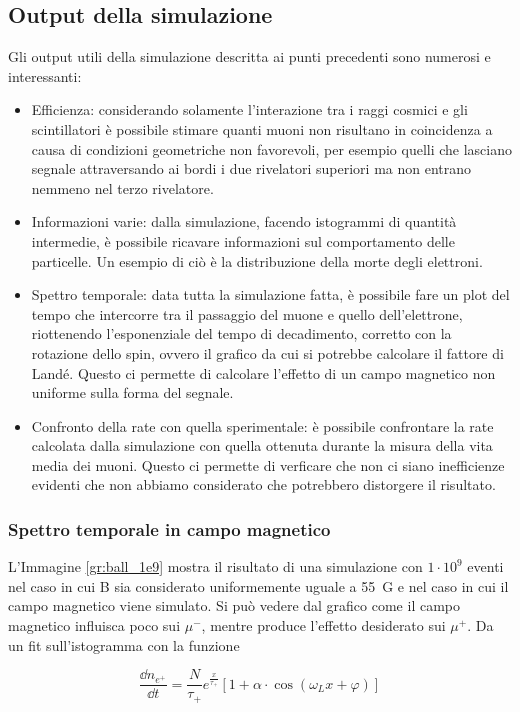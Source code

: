 \subsection{Output della simulazione}
Gli output utili della simulazione descritta ai punti precedenti sono numerosi e interessanti:
\begin{itemize}
\item Efficienza: considerando solamente l'interazione tra i raggi cosmici e gli scintillatori è possibile stimare quanti muoni non risultano in coincidenza a causa
di condizioni geometriche non favorevoli, per esempio quelli che lasciano segnale attraversando ai bordi i due rivelatori superiori ma non entrano nemmeno nel terzo
rivelatore.
\item Informazioni varie: dalla simulazione, facendo istogrammi di quantit\`a intermedie, \`e possibile ricavare informazioni sul comportamento delle particelle. Un esempio di ci\`o \`e la distribuzione della morte degli elettroni.
\item Spettro temporale: data tutta la simulazione fatta, è possibile fare un plot del tempo che intercorre tra il passaggio del muone e quello dell'elettrone, riottenendo
l'esponenziale del tempo di decadimento, corretto con la rotazione dello spin, ovvero il grafico da cui si potrebbe calcolare il fattore di Land\'e. Questo ci permette di calcolare l'effetto di un campo magnetico non uniforme sulla forma del segnale.
\item Confronto della rate con quella sperimentale: \`e possibile confrontare la rate calcolata dalla simulazione con quella ottenuta durante la misura della vita media dei muoni. Questo ci permette di verficare che non ci siano inefficienze evidenti che non abbiamo considerato che potrebbero distorgere il risultato.
\end{itemize}

\subsubsection{Spettro temporale in campo magnetico}
L'Immagine \ref{gr:ball_1e9} mostra il risultato di una simulazione con $1\cdot 10^9$ eventi nel caso in cui B sia considerato uniformemente uguale a 55~G e nel caso in cui il campo magnetico viene simulato. 
Si pu\`o vedere dal grafico come il campo magnetico influisca poco sui $\mu^-$, mentre produce l'effetto desiderato sui $\mu^+$. 
Da un fit sull'istogramma con la funzione

\begin{equation}
	\frac{\dd n_{e^+}}{\dd t} = \frac{N}{\tau_+}e^{\frac{x}{\tau_+}}\left[1 + \alpha\cdot\cos(\omega_L x + \varphi)\right]
	\label{eq:sim_fit}
\end{equation}


